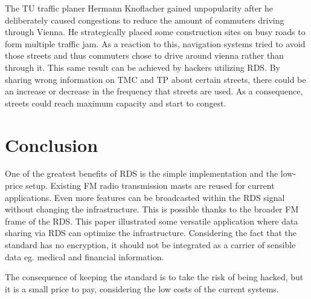 \documentclass[conference,11pt,a4paper]{IEEEtran}
\begin{document}
		The TU traffic planer Hermann Knoflacher gained unpopularity after he deliberately caused congestions to reduce the amount of commuters driving through Vienna.
		He strategically placed some construction sites on busy roads to form multiple traffic jam\cite{presse}. As a reaction to this, navigation systems tried to avoid those streets and thus commuters chose to drive around vienna rather than through it. This same result can be achieved by hackers utilizing RDS. By sharing wrong information on TMC and TP about certain streets, there could be an increase or decrease in the frequency that streets are used. As a consequence, streets could reach maximum capacity and start to congest.\\

		
	\section {Conclusion}
	
		One of the greatest benefits of RDS is the simple implementation and the low-price setup. Existing FM radio transmission masts are reused for current applications. Even more features can be broadcasted within the RDS signal without changing the infrastructure. This is possible thanks to the broader FM frame of the RDS. This paper illustrated some versatile application where data sharing via RDS can optimize the infrastructure. Considering the fact that the standard has no encryption, it should not be integrated as a carrier of sensible data eg. medical and financial information. 
		
		The consequence of keeping the standard is to take the risk of being hacked, but it is a small price to pay, considering the low costs of the current systems.
		
				
	
	
\end{document}
